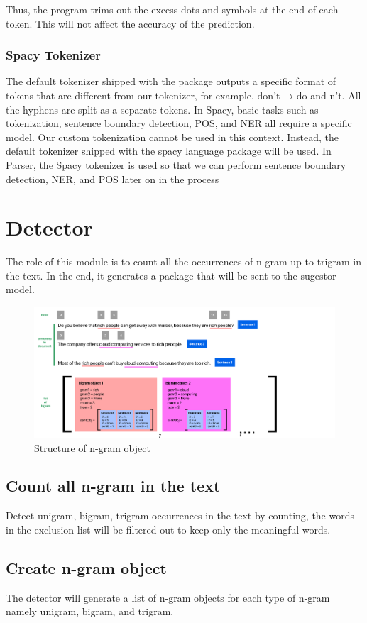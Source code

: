 \documentclass[12pt,oneside,openright,a4paper]{cpe-english-project}
\begin{document}
Thus, the program trims out the excess dots and symbols at the end of each token. This will not affect the accuracy of the prediction.

\subsubsection{Spacy Tokenizer}
The default tokenizer shipped with the package outputs a specific format of tokens that are different from our tokenizer, for example, don’t → do and n’t. All the hyphens are split as a separate tokens. In Spacy, basic tasks such as tokenization, sentence boundary detection, POS, and NER all require a specific model. Our custom tokenization cannot be used in this context. Instead, the default tokenizer shipped with the spacy language package will be used. In Parser, the Spacy tokenizer is used so that we can perform sentence boundary detection, NER, and POS later on in the process


\section{Detector}
The role of this module is to count all the occurrences of n-gram up to trigram in the text. In the end, it generates a package that will be sent to the sugestor model.
\begin{figure}[!h]\centering
\includegraphics[width=15cm]{./img/chp3/Frame 13.png}
\caption{Structure of n-gram object}\label{fig:list of ngram object}
\end{figure}
\subsection{Count all n-gram in the text}
Detect unigram, bigram, trigram occurrences in the text by counting, the words in the exclusion list will be filtered out to keep only the meaningful words.

\subsection{Create n-gram object}
The detector will generate a list of n-gram objects for each type of n-gram namely unigram, bigram, and trigram.
\end{document}

